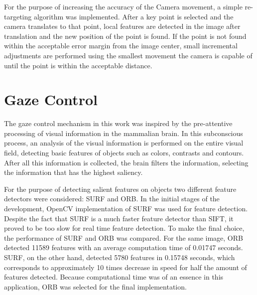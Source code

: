 \documentclass{l4proj}
\begin{document}
For the purpose of increasing the accuracy of the Camera movement, a simple re-targeting algorithm was implemented. After a key point is selected and the camera translates to that point, local features are detected in the image after translation and the new position of the point is found. If the point is not found within the acceptable error margin from the image center, small incremental adjustments are performed using the smallest movement the camera is capable of until the point is within the acceptable distance. 



\section{Gaze Control}



The gaze control mechanism in this work was inspired by the pre-attentive processing of visual information in the mammalian brain. In this subconscious process, an analysis of the visual information is performed on the entire visual field, detecting basic features of objects such as colors, contrasts and contours. After all this information is collected, the brain filters the information, selecting the information that has the highest saliency. 



For the purpose of detecting salient features on objects two different feature detectors were considered: SURF and ORB. In the initial stages of the development, OpenCV implementation of SURF was used for feature detection. Despite the fact that SURF is a much faster feature detector than SIFT, it proved to be too slow for real time feature detection. To make the final choice, the performance of SURF and ORB was compared. For the same image, ORB detected 11589 features with an average computation time of 0.01747 seconds. SURF, on the other hand, detected 5780 features in 0.15748 seconds, which corresponds to approximately 10 times decrease in speed for half the amount of features detected. Because computational time was of an essence in this application, ORB was selected for the final implementation. 
\end{document}
